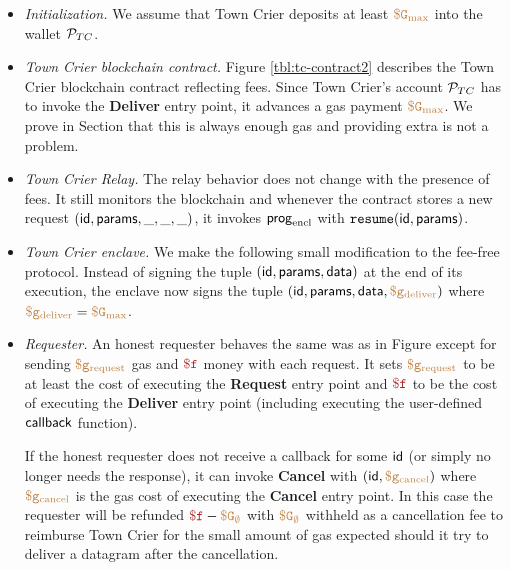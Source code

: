 \begin{itemize}[leftmargin=1.5em]
  \item {\it Initialization.}
    We assume that Town Crier deposits at least $\tt {\color{brown} \$G_\text{max} }$ into the wallet ${\cal P}_{TC}$.

  \item {\it Town Crier blockchain contract.}
    Figure \ref{tbl:tc-contract2} describes the Town Crier blockchain contract reflecting fees.
    Since Town Crier's account ${\cal P}_{TC}$ has to invoke the {\bf Deliver} entry point, it advances a gas payment $\tt {\color{brown} \$G_\text{max} }$.
    We prove in Section  that this is always enough gas and providing extra is not a problem.

  \item {\it Town Crier Relay.}
    The relay behavior does not change with the presence of fees.
    It still monitors the blockchain and whenever the contract \tcont stores a new request $({\sf id}, {\sf params}, \_, \_, \_)$,
    it invokes ${\sf prog}_{\textrm{encl}}$ with $\texttt{resume}({\sf id}, {\sf params})$.

  \item {\it Town Crier enclave.}
    We make the following small modification to the fee-free protocol.
    Instead of signing the tuple $({\sf id}, {\sf params}, {\sf data})$ at the end of its execution,
    the enclave now signs the tuple $({\sf id}, {\sf params}, {\sf data}, \tt {\color{brown} \$g_\text{deliver} })$ where $\tt {\color{brown} \$g_\text{deliver} } = \tt {\color{brown} \$G_\text{max} }$.

  \item {\it Requester.}
    An honest requester behaves the same was as in Figure  except for sending $\tt {\color{brown} \$g_\text{request} }$ gas and $\fee$ money with each request.
    It sets $\tt {\color{brown} \$g_\text{request} }$ to be at least the cost of executing the {\bf Request} entry point
    and $\fee$ to be the cost of executing the {\bf Deliver} entry point (including executing the user-defined ${\sf callback}$ function).

    If the honest requester does not receive a callback for some ${\sf id}$ (or simply no longer needs the response),
    it can invoke {\bf Cancel} with $({\sf id}, \tt {\color{brown} \$g_\text{cancel} })$ where $\tt {\color{brown} \$g_\text{cancel} }$ is the gas cost of executing the {\bf Cancel} entry point.
    In this case the requester will be refunded $\fee - \constgascancel$ with $\tt {\color{brown} \$G_\emptyset }$ withheld as a cancellation fee
    to reimburse Town Crier for the small amount of gas expected should it try to deliver a datagram after the cancellation.
\end{itemize}




